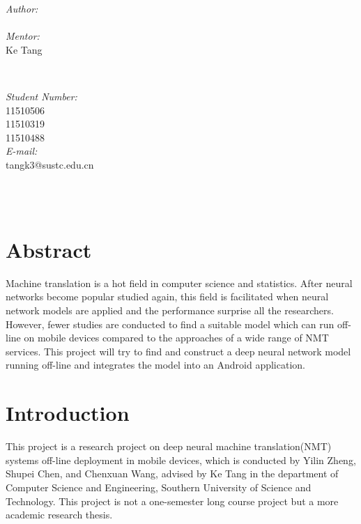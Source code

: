 \documentclass[a4paper, 12pt]{article}
\makeatletter
\let\theauthor\@author
\let\thedate\@date
\makeatother
\begin{document}
\begin{titlepage}
    \begin{minipage}{0.4\textwidth}
        \begin{flushleft} \large
            \emph{Author:}\\
            \theauthor\\
            \emph{Mentor:}\\
            Ke Tang
            \end{flushleft}
            \end{minipage}~
            \begin{minipage}{0.4\textwidth}
            \begin{flushright} \large
            \emph{Student Number:} \\
            11510506\\
            11510319\\
            11510488\\
            \emph{E-mail:}\\
            tangk3@sustc.edu.cn                       
        \end{flushright}
    \end{minipage}\\[2 cm]
    
    {\large \thedate}\\[2 cm]
 
    \vfill
    
\end{titlepage}


\tableofcontents
\pagebreak


\section{Abstract}
Machine translation is a hot field in computer science and statistics. After neural networks become popular studied again, this field is facilitated when neural network models are applied and the performance surprise all the researchers. However, fewer studies are conducted to find a suitable model which can run off-line on mobile devices compared to the approaches of a wide range of NMT services. This project will try to find and construct a deep neural network model running off-line and integrates the model into an Android application.

\section{Introduction}
This project is a research project on deep neural machine translation(NMT) systems off-line deployment in mobile devices, which is conducted by Yilin Zheng, Shupei Chen, and Chenxuan Wang, advised by Ke Tang in the department of Computer Science and Engineering, Southern University of Science and Technology. This project is not a one-semester long course project but a more academic research thesis.
\end{document}
